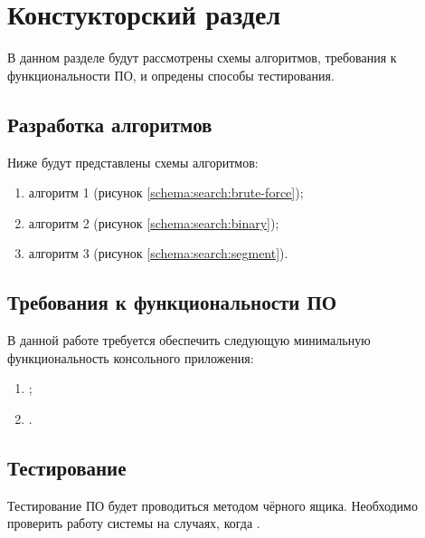 \chapter{ Констукторский раздел}
\label{cha:design}
    В данном разделе будут рассмотрены схемы алгоритмов, требования к функциональности ПО,
    и опредены способы тестирования.
    
    \section{Разработка алгоритмов}
        Ниже будут представлены схемы алгоритмов: \begin{enumerate}
            \item алгоритм 1 (рисунок \ref{schema:search:brute-force});
            \item алгоритм 2  (рисунок \ref{schema:search:binary});
            \item алгоритм 3 (рисунок \ref{schema:search:segment}).
        \end{enumerate}

    \section{Требования к функциональности ПО}
        В данной работе требуется обеспечить следующую минимальную функциональность консольного приложения:
        \begin{enumerate}
            \item ;
            \item .
        \end{enumerate}

    \section{Тестирование}
        Тестирование ПО будет проводиться методом чёрного ящика. Необходимо проверить работу системы 
        на случаях, когда .

\newpage